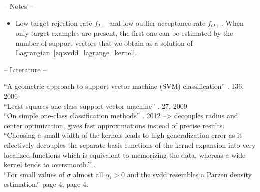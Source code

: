 


-- Notes --
\begin{itemize}
  \item Low target rejection rate $f_{T-}$ and low outlier acceptance rate $f_{O+}$. When only target examples are present, the first one can be estimated by the number of support vectors that we obtain as a solution of Lagrangian~\ref{eq:svdd_lagrange_kernel}.
\end{itemize}

-- Literature --


``A geometric approach to support vector machine (SVM) classification'' \cite{mavroforakis2006geometric}. 136, 2006 \\

``Least squares one-class support vector machine'' \cite{choi2009least}. 27, 2009 \\

``On simple one-class classification methods'' \cite{noumir2012simple}. 2012  --> decouples radius and center optimization, gives fast approximations instead of precise results. \\

``Choosing a small width of the kernels leads to high generalization error as it effectively decouples the separate basis functions of the kernel expansion into very localized functions which is equivalent to memorizing the data, whereas a wide kernel tends to oversmooth.'' \cite{smola1998connection}. \\

``For small values of $\sigma$ almost all $\alpha_i >0$ and the \gls{svdd} resembles a Parzen density estimation.'' \cite{tax2002uniform} page 4, \cite{tax1999support} page 4. \\